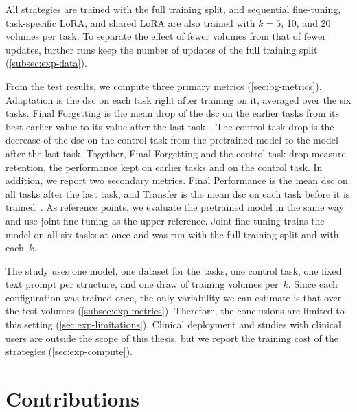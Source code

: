 All strategies are trained with the full training split, and sequential fine-tuning, task-specific LoRA, and shared LoRA are also trained with $k = 5$, 10, and 20 volumes per task.
To separate the effect of fewer volumes from that of fewer updates, further runs keep the number of updates of the full training split (\cref{subsec:exp-data}).

From the test results, we compute three primary metrics (\cref{sec:bg-metrics}).
Adaptation is the \gls{dsc} on each task right after training on it, averaged over the six tasks.
Final Forgetting is the mean drop of the \gls{dsc} on the earlier tasks from its best earlier value to its value after the last task~\cite{Chaudhry_2018}.
The control-task drop is the decrease of the \gls{dsc} on the control task from the pretrained model to the model after the last task.
Together, Final Forgetting and the control-task drop measure retention, the performance kept on earlier tasks and on the control task.
In addition, we report two secondary metrics.
Final Performance is the mean \gls{dsc} on all tasks after the last task, and Transfer is the mean \gls{dsc} on each task before it is trained~\cite{zheng2023preventingzeroshottransferdegradation}.
As reference points, we evaluate the pretrained model in the same way and use joint fine-tuning as the upper reference.
Joint fine-tuning trains the model on all six tasks at once and was run with the full training split and with each~$k$.

The study uses one model, one dataset for the tasks, one control task, one fixed text prompt per structure, and one draw of training volumes per~$k$.
Since each configuration was trained once, the only variability we can estimate is that over the test volumes (\cref{subsec:exp-metrics}).
Therefore, the conclusions are limited to this setting (\cref{sec:exp-limitations}).
Clinical deployment and studies with clinical users are outside the scope of this thesis, but we report the training cost of the strategies (\cref{sec:exp-compute}).

\section{Contributions}
\label{sec:intro-contributions}

